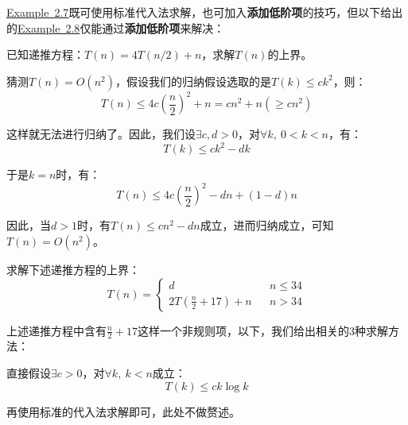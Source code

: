 \documentclass[12pt,a4paper,violet]{bbe}
\begin{document}
\hyperref[ex2.7]{Example~2.7}既可使用标准代入法求解，也可加入\textbf{添加低阶项}的技巧，但以下给出的\hyperref[ex2.8]{Example~2.8}仅能通过\textbf{添加低阶项}来解决：
\begin{example}\label{ex2.8}
	已知递推方程：$T(n)=4T(n/2)+n$，求解$T(n)$的上界。
\end{example}
\begin{solution}
	猜测$T(n)=O(n^2)$，假设我们的归纳假设选取的是$T(k)\leqslant ck^2$，则：
	$$
	T(n)\leqslant4c\left(\frac{n}{2}\right)^2+n=cn^2+n(\geqslant cn^2)
	$$
	
	这样就无法进行归纳了。因此，我们设$\exists c,d>0$，对$\forall k,~0<k<n$，有：
	$$
	T(k)\leqslant ck^2-dk
	$$
	
	于是$k=n$时，有：
	$$
	T(n)\leqslant 4c\left(\frac{n}{2}\right)^2-dn+(1-d)n
	$$
	
	因此，当$d>1$时，有$T(n)\leqslant cn^2-dn$成立，进而归纳成立，可知$T(n)=O(n^2)$。
\end{solution}
\begin{example}
		求解下述递推方程的上界：
	$$
	T(n)=\left\{\begin{array}{lcc}
		d&&n\leqslant34\\
		2T(\frac{n}{2}+17)+n&&n>34
	\end{array}\right.
	$$
\end{example}
上述递推方程中含有$\frac{n}{2}+17$这样一个非规则项，以下，我们给出相关的3种求解方法：
\begin{solution}[\textbf{（方法3）}]
直接假设$\exists c>0$，对$\forall k,~k<n$成立：
$$
T(k)\leqslant ck\log k
$$

再使用标准的代入法求解即可，此处不做赘述。
\end{solution}
	
	
	
\end{document}
